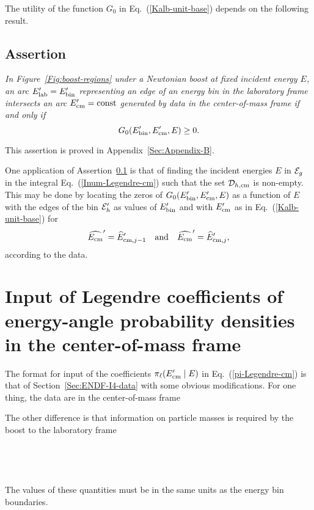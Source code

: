 The utility of the function $G_0$ in Eq.~(\ref{Kalb-unit-base})
depends on the following result.

\subsection{Assertion}\label{Sec:assertion8}
\textit{In Figure~\ref{Fig:boost-regions} under a Newtonian boost at fixed incident energy $E$, 
an arc $E_{\text{lab}}' = E_{\text{bin}}'$ representing an edge of an energy bin in
the laboratory frame intersects an arc
$E_{\text{cm}}' = {\rm const}$ generated by data
in the center-of-mass frame  if and only if}
\begin{equation}
   G_0( E_{\text{bin}}', E_{\text{cm}}', E ) \ge 0.
  \label{G0-pos}
\end{equation}

This assertion is proved in Appendix~\ref{Sec:Appendix-B}.

One application of Assertion~\ref{Sec:assertion8} is that of finding the incident energies
$E$ in ${\cal E}_g$ in the integral Eq.~(\ref{Inum-Legendre-cm}) such that
the set ${\cal D}_{h, \text{cm} }$ is non-empty.  This may be done by
locating the zeros of $G_0( E_{\text{bin}}',  E_{\text{cm}}', E )$ as a function of $E$
with the edges of the bin ${\cal E}_h'$ as values of $E_{\text{bin}}'$ and with
$E_{\text{cm}}'$ as in Eq.~(\ref{Kalb-unit-base}) for 
$$
  \widehat {E_{\text{cm}}}' = \widehat E'_{\text{cm}, j-1}
  \quad \text{and} \quad
  \widehat {E_{\text{cm}}}' = \widehat E'_{\text{cm}, j},
$$
according to the data.

\section{Input of Legendre coefficients of energy-angle probability
densities in the center-of-mass frame}
The format for input of the coefficients $\pi_\ell( E_{\text{cm}}' \mid E)$
in Eq.~(\ref{pi-Legendre-cm}) is that of Section~\ref{Sec:ENDF-I4-data}
with some obvious modifications.  For one thing, the data are in
the center-of-mass frame\\
 
The other difference is that information on particle masses is
required by the boost to the laboratory frame\\
   \\
  \\
  \\
  \\
The values of these quantities must be in the same units as
the energy bin boundaries.

